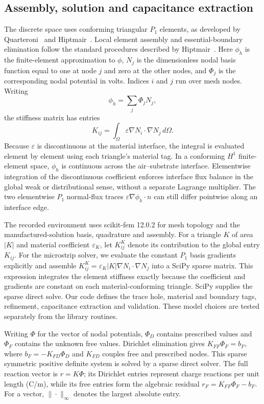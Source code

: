 \documentclass[11pt]{article}
\begin{document}
\subsection{Assembly, solution and capacitance extraction}

The discrete space uses conforming triangular $P_1$ elements, as developed by Quarteroni~\cite[Sec.~4.5]{quarteroni2017} and Hiptmair~\cite[Sec.~2.4]{hiptmair2025}. Local element assembly and essential-boundary elimination follow the standard procedures described by Hiptmair~\cite[Secs.~2.7.4 and 2.7.6]{hiptmair2025}. Here $\phi_h$ is the finite-element approximation to $\phi$, $N_j$ is the dimensionless nodal basis function equal to one at node $j$ and zero at the other nodes, and $\Phi_j$ is the corresponding nodal potential in volts. Indices $i$ and $j$ run over mesh nodes. Writing
\[
\phi_h=\sum_j \Phi_j N_j,
\]
the stiffness matrix has entries
\[
K_{ij}=\int_{\Omega}\varepsilon \nabla N_i\cdot \nabla N_j\,d\Omega.
\]
Because $\varepsilon$ is discontinuous at the material interface, the integral is evaluated element by element using each triangle's material tag. In a conforming $H^1$ finite-element space, $\phi_h$ is continuous across the air--substrate interface. Elementwise integration of the discontinuous coefficient enforces interface flux balance in the global weak or distributional sense, without a separate Lagrange multiplier. The two elementwise $P_1$ normal-flux traces $\varepsilon\nabla\phi_h\cdot n$ can still differ pointwise along an interface edge.

The recorded environment uses scikit-fem 12.0.2 for mesh topology and the manufactured-solution basis, quadrature and assembly. For a triangle $K$ of area $|K|$ and material coefficient $\varepsilon_K$, let $K^K_{ij}$ denote its contribution to the global entry $K_{ij}$. For the microstrip solver, we evaluate the constant $P_1$ basis gradients explicitly and assemble $K^K_{ij}=\varepsilon_K|K|\nabla N_i\cdot\nabla N_j$ into a SciPy sparse matrix. This expression integrates the element stiffness exactly because the coefficient and gradients are constant on each material-conforming triangle. SciPy supplies the sparse direct solve. Our code defines the trace hole, material and boundary tags, refinement, capacitance extraction and validation. These model choices are tested separately from the library routines.

Writing $\Phi$ for the vector of nodal potentials, $\Phi_D$ contains prescribed values and $\Phi_F$ contains the unknown free values. Dirichlet elimination gives $K_{FF}\Phi_F=b_F$, where $b_F=-K_{FD}\Phi_D$ and $K_{FD}$ couples free and prescribed nodes. This sparse symmetric positive definite system is solved by a sparse direct solver. The full reaction vector is $r=K\Phi$; its Dirichlet entries represent charge reactions per unit length (C/m), while its free entries form the algebraic residual $r_F=K_{FF}\Phi_F-b_F$. For a vector, $\|\cdot\|_\infty$ denotes the largest absolute entry.
\end{document}
